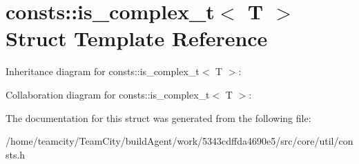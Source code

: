 \hypertarget{structconsts_1_1is__complex__t}{}\section{consts\+:\+:is\+\_\+complex\+\_\+t$<$ T $>$ Struct Template Reference}
\label{structconsts_1_1is__complex__t}


Inheritance diagram for consts\+:\+:is\+\_\+complex\+\_\+t$<$ T $>$\+:


Collaboration diagram for consts\+:\+:is\+\_\+complex\+\_\+t$<$ T $>$\+:


The documentation for this struct was generated from the following file\+:\begin{DoxyCompactItemize}
\item 
/home/teamcity/\+Team\+City/build\+Agent/work/5343cdffda4690e5/src/core/util/consts.\+h\end{DoxyCompactItemize}
